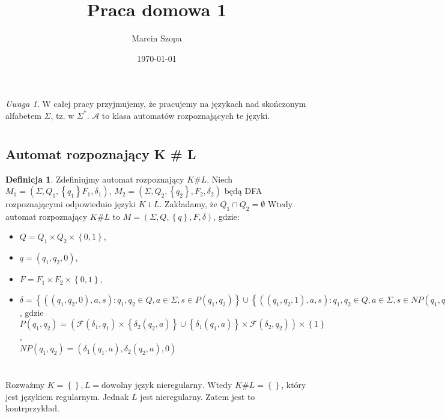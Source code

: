\documentclass{article}
\title{Praca domowa 1}
\author{Marcin Szopa}
\date{\today}
\theoremstyle{definition}
\newtheorem{definition}{Definicja}[section]
\theoremstyle{remark}
\newtheorem*{remark}{Uwaga}
\newcommand{\singleton}[1]{\left\{ #1 \right\}}
\begin{document}
\maketitle

\begin{remark}
    W całej pracy przyjmujemy, że pracujemy na językach nad skończonym alfabetem \(\Sigma\), tz. w \( \Sigma^* \). \(\mathcal{A}\) to klasa automatów rozpoznających te języki.
\end{remark}

\section{}

\subsection{Automat rozpoznający K \# L}

\begin{definition}

Zdefiniujmy automat rozpoznający \(K \# L\).
Niech \(M_1 = (\Sigma, Q_1, \singleton{q_1} F_1, \delta_1)\), \(M_2 = (\Sigma, Q_2, \singleton{q_2}, F_2, \delta_2)\)
będą DFA rozpoznającymi odpowiednio języki \(K\) i \(L\). Zakładamy, że \(Q_1 \cap Q_2 = \emptyset\) Wtedy automat rozpoznający \(K \# L\) to
\(M = (\Sigma, Q, \singleton{q}, F, \delta)\), gdzie:

\begin{itemize}
    \item \(Q = Q_1 \times Q_2 \times \left\{ 0, 1 \right\}\),
    \item \(q = (q_1, q_2, 0)\),
    \item \(F = F_1 \times F_2 \times \left\{ 0, 1 \right\} \),
    \item \(\delta = \left\{ \left( \left(q_1, q_2, 0 \right), a, s \right): q_1, q_2 \in Q, a \in \Sigma, s \in P(q_1, q_2) \right\}
    \cup \left\{ \left( \left(q_1, q_2, 1 \right), a, s\right): q_1, q_2 \in Q, a \in \Sigma, s \in NP(q_1, q_2) \right\} \), gdzie \\
    \(P(q_1, q_2) = \left( \mathcal{F}(\delta_1, q_1) \times \singleton{\delta_2(q_2,a)}
     \cup \singleton{\delta_1(q_1,a)} \times \mathcal{F}(\delta_2, q_2) \right) \times \singleton{1}\), \\
     \(NP(q_1, q_2) =  \left( \delta_1(q_1,a), \delta_2(q_2,a), 0 \right)\) \\
\end{itemize}

\end{definition}

\section{}

Rozważmy \(K = \left\{ \right\}, L = \text{dowolny język nieregularny}\). Wtedy
\(K \# L = \left\{ \right\}\), który jest językiem regularnym. Jednak \(L\)
jest nieregularny. Zatem jest to kontrprzykład.
\end{document}
